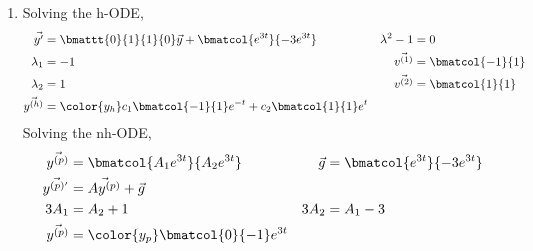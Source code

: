 \begin{enumerate}
    \item Solving the h-ODE,
          \begin{align}
              \vec{y'}                     & = \bmattt{0}{1}{1}{0} \vec{y}
              + \bmatcol{e^{3t}}{-3e^{3t}} &
              \lambda^{2} - 1              & = 0                             \\
              \lambda_1                    & = -1                          &
              \vec{v^{(1)}}                & = \bmatcol{-1}{1}               \\
              \lambda_2                    & = 1                           &
              \vec{v^{(2)}}                & = \bmatcol{1}{1}                \\
              \vec{y^{(h)}}                & = \color{y_h}
              c_1 \bmatcol{-1}{1}e^{-t} + c_2 \bmatcol{1}{1} e^{t}
          \end{align}
          Solving the nh-ODE,
          \begin{align}
              \vec{y^{(p)}}  & = \bmatcol{A_1 e^{3t}}{A_2 e^{3t}}  &
              \vec{g}        & = \bmatcol{e^{3t}}{-3 e^{3t}}         \\
              \vec{y^{(p)'}} & = \vec{Ay^{(p)}} + \vec{g}            \\
              3A_1           & = A_2 + 1                           &
              3A_2           & = A_1 - 3                             \\
              \vec{y^{(p)}}  & = \color{y_p} \bmatcol{0}{-1}e^{3t}
          \end{align}


\end{enumerate}
